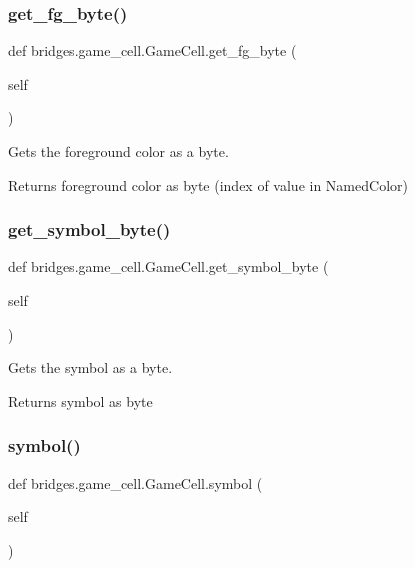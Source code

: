 \subsubsection{\texorpdfstring{get\+\_\+fg\+\_\+byte()}{get\_fg\_byte()}}
{\footnotesize\ttfamily def bridges.\+game\+\_\+cell.\+Game\+Cell.\+get\+\_\+fg\+\_\+byte (\begin{DoxyParamCaption}\item[{}]{self }\end{DoxyParamCaption})}



Gets the foreground color as a byte. 

\begin{DoxyReturn}{Returns}
foreground color as byte (index of value in Named\+Color) 
\end{DoxyReturn}
\mbox{\label{classbridges_1_1game__cell_1_1_game_cell_ac61e8e3f172dc2a5e2d2cb32426a089b}} 
\subsubsection{\texorpdfstring{get\+\_\+symbol\+\_\+byte()}{get\_symbol\_byte()}}
{\footnotesize\ttfamily def bridges.\+game\+\_\+cell.\+Game\+Cell.\+get\+\_\+symbol\+\_\+byte (\begin{DoxyParamCaption}\item[{}]{self }\end{DoxyParamCaption})}



Gets the symbol as a byte. 

\begin{DoxyReturn}{Returns}
symbol as byte 
\end{DoxyReturn}
\mbox{\label{classbridges_1_1game__cell_1_1_game_cell_adc1c02a52845c2673d43167212574904}} 
\subsubsection{\texorpdfstring{symbol()}{symbol()}\hspace{0.1cm}{\footnotesize\ttfamily [1/2]}}
{\footnotesize\ttfamily def bridges.\+game\+\_\+cell.\+Game\+Cell.\+symbol (\begin{DoxyParamCaption}\item[{}]{self }\end{DoxyParamCaption})}



